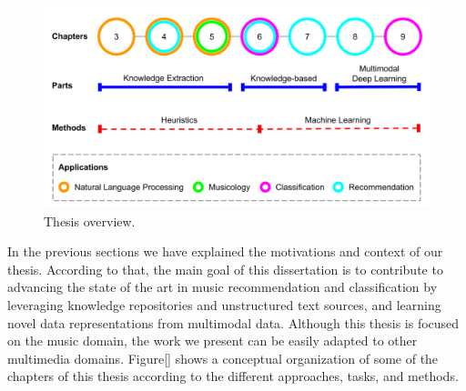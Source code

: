 \begin{figure}
	\centering
	\includegraphics[width=\textwidth]{ch01_introduction_pics/Thesis_schema.png}
	\caption{Thesis overview.\label{fig:intro:chapters}}
\end{figure}

In the previous sections we have explained the motivations and context of our thesis. According to that, the main goal of this dissertation is to contribute to advancing the state of the art in music recommendation and classification by leveraging knowledge repositories and unstructured text sources, and learning novel data representations from multimodal data. Although this thesis is focused on the music domain, the work we present can be easily adapted to other multimedia domains. Figure\ref{} shows a conceptual organization of some of the chapters of this thesis according to the different approaches, tasks, and methods.

